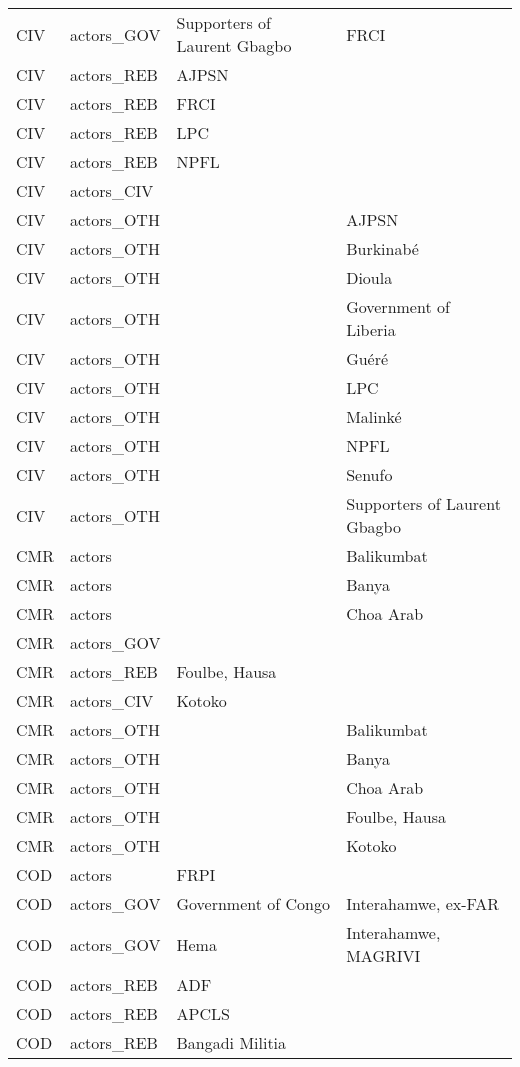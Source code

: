 \begin{table}[ht]
\begin{tabular}{llll}
  CIV & actors\_GOV & Supporters of Laurent Gbagbo & FRCI \\ 
  CIV & actors\_REB & AJPSN &  \\ 
  CIV & actors\_REB & FRCI &  \\ 
  CIV & actors\_REB & LPC &  \\ 
  CIV & actors\_REB & NPFL &  \\ 
  CIV & actors\_CIV &  &  \\ 
  CIV & actors\_OTH &  & AJPSN \\ 
  CIV & actors\_OTH &  & Burkinabé \\ 
  CIV & actors\_OTH &  & Dioula \\ 
  CIV & actors\_OTH &  & Government of Liberia \\ 
  CIV & actors\_OTH &  & Guéré \\ 
  CIV & actors\_OTH &  & LPC \\ 
  CIV & actors\_OTH &  & Malinké \\ 
  CIV & actors\_OTH &  & NPFL \\ 
  CIV & actors\_OTH &  & Senufo \\ 
  CIV & actors\_OTH &  & Supporters of Laurent Gbagbo \\ 
  CMR & actors &  & Balikumbat \\ 
  CMR & actors &  & Banya \\ 
  CMR & actors &  & Choa Arab \\ 
  CMR & actors\_GOV &  &  \\ 
  CMR & actors\_REB & Foulbe, Hausa &  \\ 
  CMR & actors\_CIV & Kotoko &  \\ 
  CMR & actors\_OTH &  & Balikumbat \\ 
  CMR & actors\_OTH &  & Banya \\ 
  CMR & actors\_OTH &  & Choa Arab \\ 
  CMR & actors\_OTH &  & Foulbe, Hausa \\ 
  CMR & actors\_OTH &  & Kotoko \\ 
  COD & actors & FRPI &  \\ 
  COD & actors\_GOV & Government of Congo & Interahamwe, ex-FAR \\ 
  COD & actors\_GOV & Hema & Interahamwe, MAGRIVI \\ 
  COD & actors\_REB & ADF &  \\ 
  COD & actors\_REB & APCLS &  \\ 
  COD & actors\_REB & Bangadi Militia &  \\ 

\end{tabular}
\end{table}

